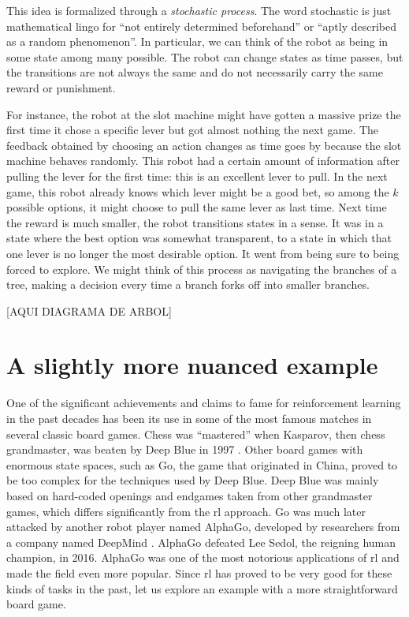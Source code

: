 This idea is formalized through a \textit{stochastic process}. The word
stochastic is just mathematical lingo for ``not entirely determined beforehand''
or ``aptly described as a random phenomenon''. In particular, we can think of
the robot as being in some state among many possible. The robot can change
states as time passes, but the transitions are not always the same and do not
necessarily carry the same reward or punishment.

For instance, the robot at the slot machine might have gotten a massive prize
the first time it chose a specific lever but got almost nothing the next game.
The feedback obtained by choosing an action changes as time goes by because the
slot machine behaves randomly. This robot had a certain amount of information
after pulling the lever for the first time: this is an excellent lever to pull.
In the next game, this robot already knows which lever might be a good bet, so
among the $k$ possible options, it might choose to pull the same lever as last
time. Next time the reward is much smaller, the robot transitions states in a
sense. It was in a state where the best option was somewhat transparent, to a
state in which that one lever is no longer the most desirable option. It went
from being sure to being forced to explore. We might think of this process as
navigating the branches of a tree, making a decision every time a branch forks
off into smaller branches.

[AQUI DIAGRAMA DE ARBOL]

\section{A slightly more nuanced example}

One of the significant achievements and claims to fame for reinforcement
learning in the past decades has been its use in some of the most famous matches
in several classic board games. Chess was ``mastered'' when Kasparov, then chess
grandmaster, was beaten by Deep Blue in 1997 \cite{silverchess}. Other board
games with enormous state spaces, such as Go, the game that originated in China,
proved to be too complex for the techniques used by Deep Blue. Deep Blue was
mainly based on hard-coded openings and endgames taken from other grandmaster
games, which differs significantly from the \ac{rl} approach. Go was much later
attacked by another robot player named AlphaGo, developed by researchers from a
company named DeepMind \cite{silver2017mastering}. AlphaGo defeated Lee Sedol,
the reigning human champion, in 2016. AlphaGo was one of the most notorious
applications of \ac{rl} and made the field even more popular. Since \ac{rl} has
proved to be very good for these kinds of tasks in the past, let us explore an
example with a more straightforward board game.

